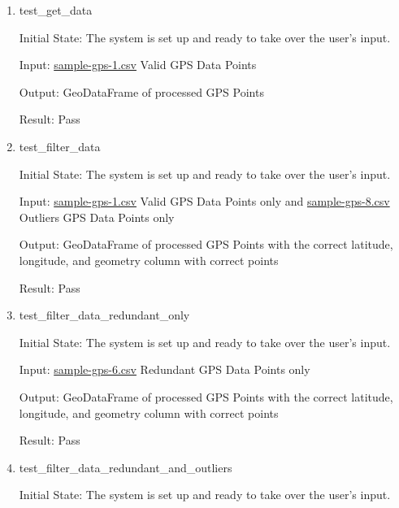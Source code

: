 \documentclass[12pt, titlepage]{article}
\begin{document}
\begin{enumerate}
    \item{test\_get\_data} \label{test_get_data}
    
    Initial State: The system is set up and ready to take over the user’s input.

    Input: \href{https://github.com/paezha/PyERT-BLACK/blob/rev0-test/quarto-example/data/sample-gps/sample-gps-1.csv}{sample-gps-1.csv} Valid GPS Data Points
    
    Output: GeoDataFrame of processed GPS Points 
    
    Result: Pass



    \item{test\_filter\_data} \label{test_filter_data}
    
    Initial State: The system is set up and ready to take over the user’s input.

    Input: \href{https://github.com/paezha/PyERT-BLACK/blob/rev0-test/quarto-example/data/sample-gps/sample-gps-1.csv}{sample-gps-1.csv} Valid GPS Data Points only and \href{https://github.com/paezha/PyERT-BLACK/blob/rev0-test/quarto-example/data/sample-gps/sample-gps-8.csv}{sample-gps-8.csv} Outliers GPS Data Points only
    
    Output: GeoDataFrame of processed GPS Points with the correct latitude, longitude, and geometry column with correct points
    
    Result: Pass

    \item{test\_filter\_data\_redundant\_only} \label{test_filter_data_redundant_only}
    
    Initial State: The system is set up and ready to take over the user’s input.

    Input: \href{https://github.com/paezha/PyERT-BLACK/blob/rev0-test/quarto-example/data/sample-gps/sample-gps-6.csv}{sample-gps-6.csv} Redundant GPS Data Points only
    
    Output: GeoDataFrame of processed GPS Points with the correct latitude, longitude, and geometry column with correct points
    
    Result: Pass

    \item{test\_filter\_data\_redundant\_and\_outliers} \label{test_filter_data_redundant_and_outliers}
    
    Initial State: The system is set up and ready to take over the user’s input.


\end{enumerate}
\end{document}
